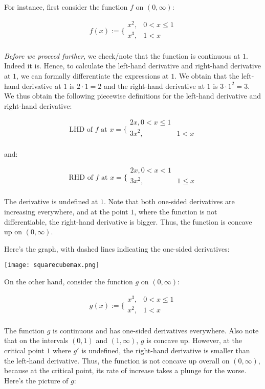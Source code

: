 \documentclass[10pt]{amsart}
\begin{document}
For instance, first consider the function $f$ on $(0,\infty)$:

$$f(x) := \lbrace\begin{array}{rl} x^2, & 0 < x \le 1\\x^3, &1 < x \\\end{array}$$

{\em Before we proceed further}, we check/note that the function is
continuous at $1$. Indeed it is. Hence, to calculate the left-hand
derivative and right-hand derivative at $1$, we can formally
differentiate the expressions at $1$. We obtain that the left-hand
derivative at $1$ is $2 \cdot 1 = 2$ and the right-hand derivative at
$1$ is $3 \cdot 1^2 = 3$. We thus obtain the following piecewise
definitions for the left-hand derivative and right-hand derivative:

$$\text{LHD of $f$ at } x = \lbrace\begin{array}{rl} 2x, 0 < x \le 1 \\3x^2, &1 < x \\\end{array}$$

and:

$$\text{RHD of $f$ at } x = \lbrace\begin{array}{rl} 2x, 0 < x < 1 \\3x^2, &1 \le x \\\end{array}$$

The derivative is undefined at $1$. Note that both one-sided
derivatives are increasing everywhere, and at the point $1$, where the
function is not differentiable, the right-hand derivative is
bigger. Thus, the function is concave up on $(0,\infty)$.

Here's the graph, with dashed lines indicating the one-sided derivatives:

\texttt{[image: squarecubemax.png]}

On the other hand, consider the function $g$ on $(0,\infty)$:

$$g(x) := \lbrace\begin{array}{rl} x^3, & 0 < x \le 1\\x^2, & 1 < x \\\end{array}$$

The function $g$ is continuous and has one-sided derivatives
everywhere. Also note that on the intervals $(0,1)$ and $(1,\infty)$,
$g$ is concave up. However, at the critical point $1$ where $g'$ is
undefined, the right-hand derivative is smaller than the left-hand
derivative. Thus, the function is not concave up overall on
$(0,\infty)$, because at the critical point, its rate of increase
takes a plunge for the worse. Here's the picture of $g$:
\end{document}
